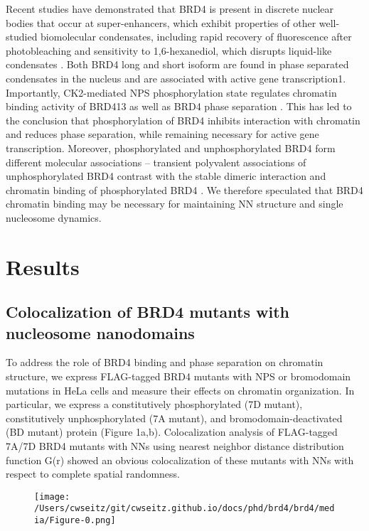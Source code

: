 Recent studies have demonstrated that BRD4 is present in discrete nuclear bodies that occur at super-enhancers, which exhibit properties of other well-studied biomolecular condensates, including rapid recovery of fluorescence after photobleaching and sensitivity to 1,6-hexanediol, which disrupts liquid-like condensates \parencite{Sabari2018}. Both BRD4 long and short isoform are found in phase separated condensates in the nucleus and are associated with active gene transcription1. Importantly, CK2-mediated NPS phosphorylation state regulates chromatin binding activity of BRD413 as well as BRD4 phase separation \parencite{Han2020}. This has led to the conclusion that phosphorylation of BRD4 inhibits interaction with chromatin and reduces phase separation, while remaining necessary for active gene transcription. Moreover, phosphorylated and unphosphorylated BRD4 form different molecular associations – transient polyvalent associations of unphosphorylated BRD4 contrast with the stable dimeric interaction and chromatin binding of phosphorylated BRD4 \parencite{Malvezzi2021}. We therefore speculated that BRD4 chromatin binding may be necessary for maintaining NN structure and single nucleosome dynamics. 


\section{Results}

\subsection{Colocalization of BRD4 mutants with nucleosome nanodomains}

To address the role of BRD4 binding and phase separation on chromatin structure, we express FLAG-tagged BRD4 mutants with NPS or bromodomain mutations in HeLa cells and measure their effects on chromatin organization. In particular, we express a constitutively phosphorylated (7D mutant), constitutively unphosphorylated (7A mutant), and bromodomain-deactivated (BD mutant) protein (Figure 1a,b). Colocalization analysis of FLAG-tagged 7A/7D BRD4 mutants with NNs using nearest neighbor distance distribution function G(r) showed an obvious colocalization of these mutants with NNs with respect to complete spatial randomness. 

\begin{figure}[t]
\texttt{[image: /Users/cwseitz/git/cwseitz.github.io/docs/phd/brd4/brd4/media/Figure-0.png]}
\caption{}
\end{figure}
	
